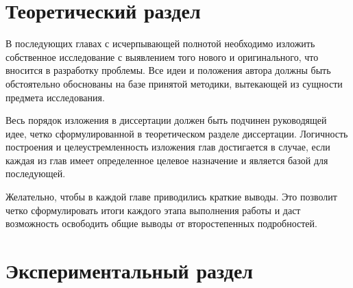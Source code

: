 \chapter{Теоретический раздел}

В последующих главах с исчерпывающей полнотой  необходимо изложить собственное исследование с выявлением того нового и оригинального, что вносится в разработку проблемы. Все идеи и положения автора должны быть обстоятельно обоснованы на базе принятой методики, вытекающей из сущности предмета исследования.

Весь порядок изложения в диссертации должен быть подчинен  руководящей идее, четко сформулированной в теоретическом разделе диссертации. Логичность построения и целеустремленность изложения  глав достигается в случае, если каждая из глав имеет определенное целевое назначение и является базой для последующей.

Желательно, чтобы в каждой главе приводились краткие выводы. Это позволит четко сформулировать итоги каждого этапа выполнения работы и даст возможность освободить общие выводы от второстепенных подробностей.

\chapter{Экспериментальный раздел}
